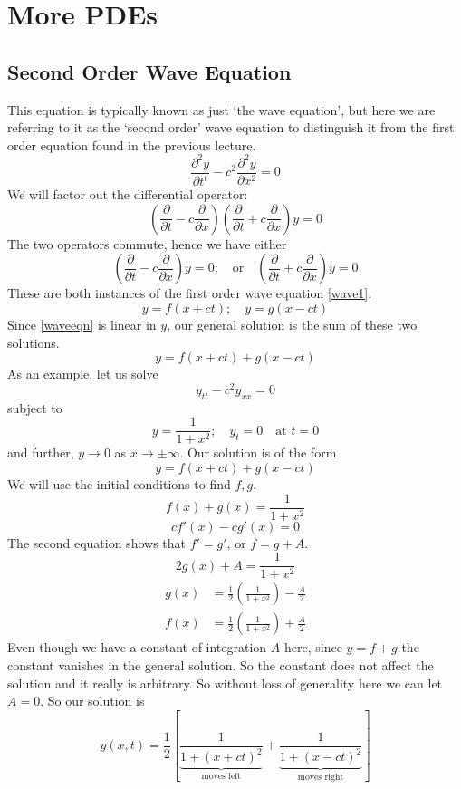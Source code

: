 \documentclass{article}
\begin{document}
\section{More PDEs}
\subsection{Second Order Wave Equation}
This equation is typically known as just `the wave equation', but here we are referring to it as the `second order' wave equation to distinguish it from the first order equation found in the previous lecture.
\begin{equation}\label{waveeqn}
    \frac{\partial^2 y}{\partial t^t} - c^2 \frac{\partial^2 y}{\partial x^2} = 0
\end{equation}
We will factor out the differential operator:
\[ \left( \frac{\partial}{\partial t} - c\frac{\partial}{\partial x} \right)\left( \frac{\partial}{\partial t} + c\frac{\partial}{\partial x} \right)y = 0 \]
The two operators commute, hence we have either
\[ \left( \frac{\partial}{\partial t} - c\frac{\partial}{\partial x} \right) y = 0;\quad\text{or}\quad \left( \frac{\partial}{\partial t} + c\frac{\partial}{\partial x} \right) y = 0 \]
These are both instances of the first order wave equation \eqref{wave1}.
\[ y = f(x+ct);\quad y=g(x-ct) \]
Since \eqref{waveeqn} is linear in $y$, our general solution is the sum of these two solutions.
\[ y = f(x+ct) + g(x-ct) \]
As an example, let us solve
\[ y_{tt} - c^2 y_{xx} = 0 \]
subject to
\[ y = \frac{1}{1+x^2}; \quad y_t = 0\quad \text{at }t=0 \]
and further, $y \to 0$ as $x \to \pm \infty$. Our solution is of the form
\[ y = f(x+ct) + g(x-ct) \]
We will use the initial conditions to find $f, g$.
\[ f(x) + g(x) = \frac{1}{1+x^2} \]
\[ cf'(x) - cg'(x) = 0 \]
The second equation shows that $f'=g'$, or $f=g+A$.
\[ 2g(x) + A = \frac{1}{1+x^2} \]
\begin{align*}
    g(x) & = \frac{1}{2}\left( \frac{1}{1+x^2} \right) - \frac{A}{2} \\
    f(x) & = \frac{1}{2}\left( \frac{1}{1+x^2} \right) + \frac{A}{2}
\end{align*}
Even though we have a constant of integration $A$ here, since $y=f+g$ the constant vanishes in the general solution. So the constant does not affect the solution and it really is arbitrary. So without loss of generality here we can let $A = 0$. So our solution is
\[ y(x, t) = \frac{1}{2}\left[ \underbrace{\frac{1}{1+(x+ct)^2}}_{\text{moves left}} + \underbrace{\frac{1}{1+(x-ct)^2}}_{\text{moves right}} \right] \]
\end{document}
